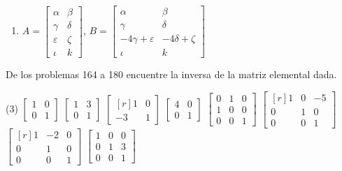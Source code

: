 \begin{enumerate}[start=150]
    \item $A=\begin{bmatrix*}\alpha & \beta \\ \gamma & \delta \\ \varepsilon & \zeta \\ \iota & k\end{bmatrix*}$, $B=\begin{bmatrix*}\alpha & \beta \\ \gamma & \delta \\ -4 \gamma+\varepsilon & -4 \delta+\zeta \\ \iota & k\end{bmatrix*}$
\end{enumerate}\newpage\noindent
De los problemas 164 a 180 encuentre la inversa de la matriz elemental dada.
\begin{tasks}[
    start=164,
    style=enumerate,
    label-offset = 4mm,
    ](3)
    \task $\begin{bmatrix*}1 & 0 \\ 0 & 1\end{bmatrix*}$
    \task $\begin{bmatrix*}1 & 3 \\ 0 & 1\end{bmatrix*}$
    \task $\begin{bmatrix*}[r]1 & 0 \\ -3 & 1\end{bmatrix*}$
    \task $\begin{bmatrix*}4 & 0 \\ 0 & 1\end{bmatrix*}$
    \task $\begin{bmatrix*}0 & 1 & 0 \\ 1 & 0 & 0 \\ 0 & 0 & 1\end{bmatrix*}$
    \task $\begin{bmatrix*}[r]1 & 0 & -5 \\ 0 & 1 & 0 \\ 0 & 0 & 1\end{bmatrix*}$
    \task $\begin{bmatrix*}[r]1 & -2 & 0 \\ 0 & 1 & 0 \\ 0 & 0 & 1\end{bmatrix*}$
    \task $\begin{bmatrix*}1 & 0 & 0 \\ 0 & 1 & 3 \\ 0 & 0 & 1\end{bmatrix*}$

\end{tasks}
